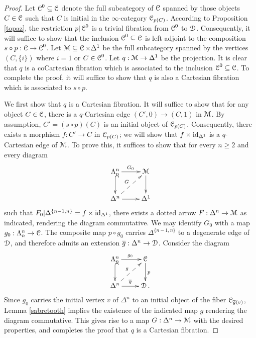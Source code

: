 \begin{proof}
Let $\operatorname{\mathcal{C}}^{0} \subseteq \operatorname{\mathcal{C}}$ denote the full subcategory of $\operatorname{\mathcal{C}}$ spanned by those
objects $C \in \operatorname{\mathcal{C}}$ such that $C$ is initial in the $\infty$-category $\operatorname{\mathcal{C}}_{p(C)}$. According to Proposition \ref{topaz}, the restriction $p| \operatorname{\mathcal{C}}^0$ is a trivial fibration from
$\operatorname{\mathcal{C}}^0$ to $\operatorname{\mathcal{D}}$. Consequently, it will suffice to show that the inclusion
$\operatorname{\mathcal{C}}^{0} \subseteq \operatorname{\mathcal{C}}$ is left adjoint to the composition $s \circ p: \operatorname{\mathcal{C}} \rightarrow \operatorname{\mathcal{C}}^{0}$.
Let $\operatorname{\mathcal{M}} \subseteq \operatorname{\mathcal{C}} \times \Delta^1$ be the full subcategory spanned by the vertices
$(C, \{i\})$ where $i = 1$ or $C \in \operatorname{\mathcal{C}}^0$. Let $q: \operatorname{\mathcal{M}} \rightarrow \Delta^1$ be the projection. It is clear that $q$ is a coCartesian fibration which is associated to the inclusion $\operatorname{\mathcal{C}}^0 \subseteq \operatorname{\mathcal{C}}$. To complete the proof, it will suffice to show that $q$ is also a Cartesian fibration
which is associated to $s \circ p$.

We first show that $q$ is a Cartesian fibration. It will suffice to show that for any object
$C \in \operatorname{\mathcal{C}}$, there is a $q$-Cartesian edge $(C',0) \rightarrow (C,1)$ in $\operatorname{\mathcal{M}}$. By assumption,
$C' = (s \circ p)(C)$ is an initial object of $\operatorname{\mathcal{C}}_{p(C)}$. Consequently, there exists
a morphism $f: C' \rightarrow C$ in $\operatorname{\mathcal{C}}_{p(C)}$; we will show that $f \times \operatorname{id}_{\Delta^1}$
is a $q$-Cartesian edge of $\operatorname{\mathcal{M}}$. To prove this, it suffices to show that for every $n \geq 2$ and every diagram
$$ \xymatrix{ \Lambda^n_n \ar@{^{(}->}[d] \ar[r]^{G_0} & \calM \ar[d] \\ 
\Delta^n \ar[r] \ar@{-->}[ur]^{G} & \Delta^1 }$$
such that $F_0 | \Delta^{ \{n-1, n\} } = f \times \operatorname{id}_{\Delta^1}$, there exists a dotted arrow $F: \Delta^n \rightarrow \operatorname{\mathcal{M}}$
as indicated, rendering the diagram commutative. We may identify $G_0$ with a map
$g_0: \Lambda^n_n \rightarrow \operatorname{\mathcal{C}}$. The composite map $p \circ g_0$ carries
$\Delta^{ \{n-1,n\} }$ to a degenerate edge of $\operatorname{\mathcal{D}}$, and therefore admits an extension
$\overline{g}: \Delta^n \rightarrow \operatorname{\mathcal{D}}$. Consider the diagram
$$ \xymatrix{ \Lambda^n_n \ar[r]^{g_0} \ar@{^{(}->}[d] & \calC \ar[d]^{p} \\
\Delta^n \ar[r]^{ \overline{g} } \ar@{-->}[ur]^{g} & \calD. }$$
Since $g_0$ carries the initial vertex $v$ of $\Delta^n$ to an initial object of the fiber
$\operatorname{\mathcal{C}}_{\overline{g}(v)}$, Lemma \ref{sabretooth} implies the existence of the indicated
map $g$ rendering the diagram commutative. This gives rise to a map $G: \Delta^n \rightarrow \operatorname{\mathcal{M}}$
with the desired properties, and completes the proof that $q$ is a Cartesian fibration.


\end{proof}
